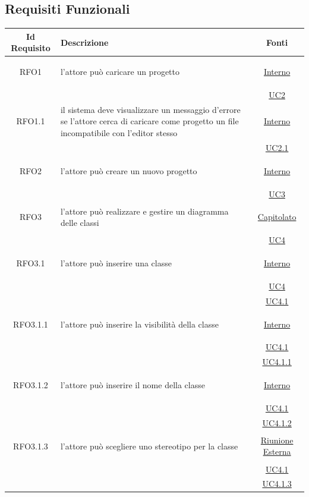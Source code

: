 \subsection{Requisiti Funzionali}
\normalsize
\begin{longtable}{|c|>{\centering}m{7cm}|c|}
\hline 
\textbf{Id Requisito} & \textbf{Descrizione} & \textbf{Fonti}\\
\hline
\endhead
\hypertarget{RFO1}{RFO1} & l'attore può caricare un progetto &  \hyperlink{Interno}{Interno}\\
& & \hyperref[UC2]{UC2}\\ \hline

\hypertarget{RFO1.1}{RFO1.1} & il sistema deve visualizzare un messaggio d'errore se l'attore cerca di caricare come progetto un file incompatibile con l'editor stesso &  \hyperlink{Interno}{Interno}\\
& & \hyperref[UC2.1]{UC2.1}\\ \hline

\hypertarget{RFO2}{RFO2} & l'attore può creare un nuovo progetto &  \hyperlink{Interno}{Interno}\\
& & \hyperref[UC3]{UC3}\\ \hline

\hypertarget{RFO3}{RFO3} & l'attore può realizzare e gestire un diagramma delle classi & \hyperlink{Capitolato}{Capitolato}\\
& & \hyperref[UC4]{UC4}\\ \hline

\hypertarget{RFO3.1}{RFO3.1} & l'attore può inserire una classe &  \hyperlink{Interno}{Interno}\\
& &\hyperref[UC4]{UC4}\\
& &\hyperref[UC4.1]{UC4.1}\\ \hline

\hypertarget{RFO3.1.1}{RFO3.1.1} & l'attore può inserire la visibilità della classe & \hyperlink{Interno}{Interno}\\
& &\hyperref[UC4.1]{UC4.1}\\
& &\hyperref[UC4.1.1]{UC4.1.1}\\ \hline

\hypertarget{RFO3.1.2}{RFO3.1.2} & l'attore può inserire il nome della classe & \hyperlink{Interno}{Interno}\\
& &\hyperref[UC4.1]{UC4.1}\\
& &\hyperref[UC4.1.2]{UC4.1.2}\\ \hline

\hypertarget{RFO3.1.3}{RFO3.1.3} & l'attore può scegliere uno stereotipo per la classe & \hyperlink{Riunione Esterna}{Riunione Esterna}\\
& &\hyperref[UC4.1]{UC4.1}\\
& &\hyperref[UC4.1.3]{UC4.1.3}\\ \hline


\end{longtable}

